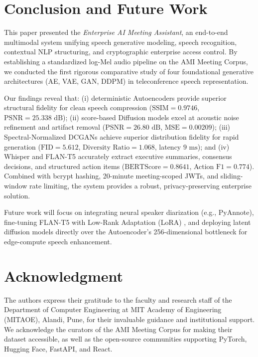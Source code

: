 \documentclass[conference]{IEEEtran}
\begin{document}
\section{Conclusion and Future Work}
\label{sec:conclusion}
This paper presented the \textit{Enterprise AI Meeting Assistant}, an end-to-end multimodal system unifying speech generative modeling, speech recognition, contextual NLP structuring, and cryptographic enterprise access control. By establishing a standardized log-Mel audio pipeline on the AMI Meeting Corpus, we conducted the first rigorous comparative study of four foundational generative architectures (AE, VAE, GAN, DDPM) in teleconference speech representation.

Our findings reveal that: (i) deterministic Autoencoders provide superior structural fidelity for clean speech compression ($\text{SSIM} = 0.9746$, $\text{PSNR} = 25.338\text{ dB}$); (ii) score-based Diffusion models excel at acoustic noise refinement and artifact removal ($\text{PSNR} = 26.80\text{ dB}$, $\text{MSE} = 0.00209$); (iii) Spectral-Normalized DCGANs achieve superior distribution fidelity for rapid generation ($\text{FID} = 5.612$, $\text{Diversity Ratio} = 1.068$, latency $9\text{ ms}$); and (iv) Whisper and FLAN-T5 accurately extract executive summaries, consensus decisions, and structured action items ($\text{BERTScore} = 0.8641$, Action $\text{F1} = 0.774$). Combined with bcrypt hashing, 20-minute meeting-scoped JWTs, and sliding-window rate limiting, the system provides a robust, privacy-preserving enterprise solution.

Future work will focus on integrating neural speaker diarization (e.g., PyAnnote), fine-tuning FLAN-T5 with Low-Rank Adaptation (LoRA) \cite{hu2021lora, mane2026edugen}, and deploying latent diffusion models \cite{rombach2022latent} directly over the Autoencoder's 256-dimensional bottleneck for edge-compute speech enhancement.

\section*{Acknowledgment}
The authors express their gratitude to the faculty and research staff of the Department of Computer Engineering at MIT Academy of Engineering (MITAOE), Alandi, Pune, for their invaluable guidance and institutional support. We acknowledge the curators of the AMI Meeting Corpus for making their dataset accessible, as well as the open-source communities supporting PyTorch, Hugging Face, FastAPI, and React.
\end{document}
